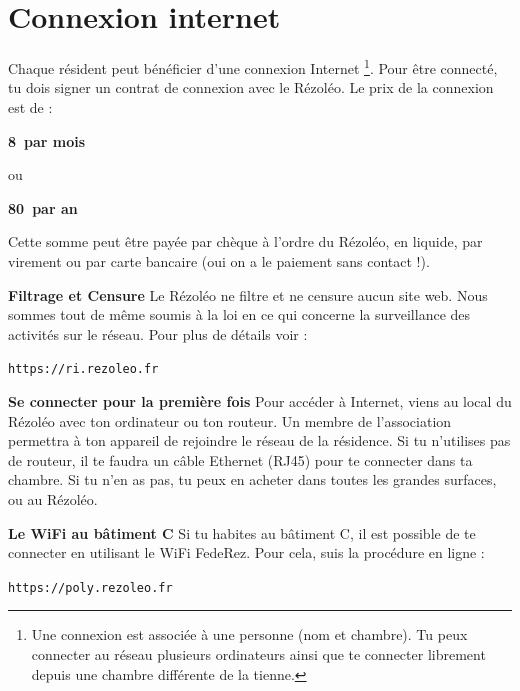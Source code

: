 \documentclass[12pt]{article}
\begin{document}
\section{Connexion internet}
  Chaque résident peut bénéficier d’une connexion Internet \footnote{Une connexion est associée à une personne (nom et chambre). Tu peux connecter au réseau plusieurs ordinateurs ainsi que te connecter librement depuis une chambre différente de la tienne.}. Pour être connecté, tu dois signer un contrat de connexion avec le Rézoléo. Le prix de la connexion est de :
  {\begin{center}
    \textbf{8\EUR~par mois}
  \end{center}
  \centerline{ou}
  \begin{center}
    \textbf{80\EUR~par an}
  \end{center}

  Cette somme peut être payée par chèque à l’ordre du Rézoléo, en liquide, par virement ou par carte bancaire (oui on a le paiement sans contact !).
  \begin{description}
    \item \textbf{Filtrage et Censure}\vspace*{0.5cm} \newline Le Rézoléo ne filtre et ne censure aucun site web. Nous sommes tout de même soumis à la loi en ce qui concerne la surveillance des activités sur le réseau. Pour plus de détails voir :
    \begin{center}
      \verb|https://ri.rezoleo.fr|
    \end{center}
    \item \textbf{Se connecter pour la première fois}\vspace*{0.5cm} \newline Pour accéder à Internet, viens au local du Rézoléo avec ton ordinateur ou ton routeur. Un membre de l’association permettra à ton appareil de rejoindre le réseau de la résidence. Si tu n'utilises pas de routeur, il te faudra un câble Ethernet (RJ45) pour te connecter dans ta chambre. Si tu n’en as pas, tu peux en acheter dans toutes les grandes surfaces, ou au Rézoléo.  
    \item \textbf{Le WiFi au bâtiment C}\vspace*{0.5cm} \newline Si tu habites au bâtiment C, il est possible de te connecter en utilisant le WiFi FedeRez. Pour cela, suis la procédure en ligne : 
    \begin{center}
      \verb|https://poly.rezoleo.fr|
    \end{center}


\end{description}}
\end{document}
